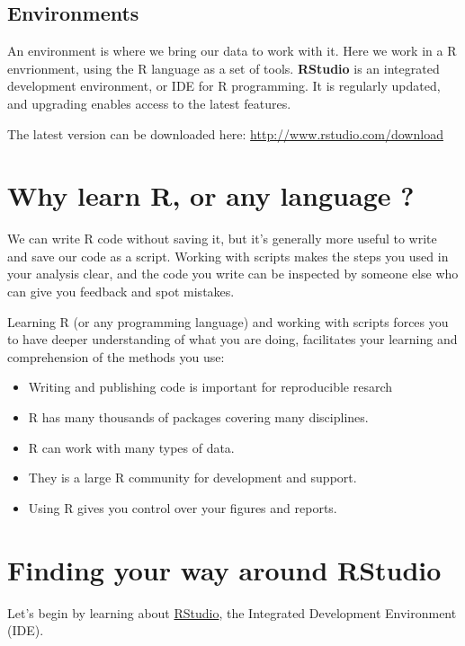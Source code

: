 \documentclass[12pt,]{book}
\providecommand{\tightlist}{%
  \setlength{\itemsep}{0pt}\setlength{\parskip}{0pt}}
\theoremstyle{definition}
\theoremstyle{definition}
\theoremstyle{definition}
\theoremstyle{remark}
\begin{document}
\subsection{Environments}\label{environments}

An environment is where we bring our data to work with it. Here we work
in a R envrionment, using the R language as a set of tools.
\textbf{RStudio} is an integrated development environment, or IDE for R
programming. It is regularly updated, and upgrading enables access to
the latest features.

The latest version can be downloaded here:
\url{http://www.rstudio.com/download}

\section{Why learn R, or any language
?}\label{why-learn-r-or-any-language}

We can write R code without saving it, but it's generally more useful to
write and save our code as a script. Working with scripts makes the
steps you used in your analysis clear, and the code you write can be
inspected by someone else who can give you feedback and spot mistakes.

Learning R (or any programming language) and working with scripts forces
you to have deeper understanding of what you are doing, facilitates your
learning and comprehension of the methods you use:

\begin{itemize}
\tightlist
\item
  Writing and publishing code is important for reproducible resarch
\item
  R has many thousands of packages covering many disciplines.
\item
  R can work with many types of data.
\item
  They is a large R community for development and support.
\item
  Using R gives you control over your figures and reports.
\end{itemize}

\section{Finding your way around
RStudio}\label{finding-your-way-around-rstudio}

Let's begin by learning about \href{https://www.rstudio.com/}{RStudio},
the Integrated Development Environment (IDE).
\end{document}
